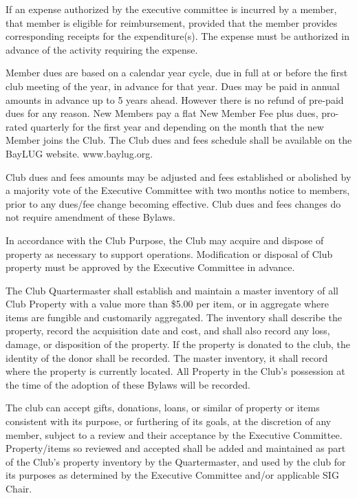 \documentclass{bylaws}
\begin{document}
If an expense authorized by the executive committee is incurred by a member, that member is eligible for reimbursement, provided that the member provides corresponding receipts for the expenditure(s). The expense must be authorized in advance of the activity requiring the expense. 

Member dues are based on a calendar year cycle, due in full at or before the first club meeting of the year, in advance for that year. Dues may be paid in annual amounts in advance up to 5 years ahead. However there is no refund of pre-paid dues for any reason. New Members pay a flat New Member Fee plus dues, pro-rated quarterly for the first year and depending on the month that the new Member joins the Club. The Club dues and fees schedule shall be available on the BayLUG website. www.baylug.org. 

Club dues and fees amounts may be adjusted and fees established or abolished by a majority vote of the Executive Committee with two months notice to members, prior to any dues/fee change becoming effective. Club dues and fees changes do not require amendment of these Bylaws.

In accordance with the Club Purpose, the Club may acquire and dispose of property as necessary to support operations. Modification or disposal of Club property must be approved by the Executive Committee in advance. 

The Club Quartermaster shall establish and maintain a master inventory of all Club Property with a value more than \$5.00 per item, or in aggregate where items are fungible and customarily aggregated. The inventory shall describe the property, record the acquisition date and cost, and shall also record any loss, damage, or disposition of the property. If the property is donated to the club, the identity of the donor shall be recorded. The master inventory, it shall record where the property is currently located. 
All Property in the Club's possession at the time of the adoption of these Bylaws will be recorded.

The club can accept gifts, donations, loans, or similar of property or items consistent with its purpose, or furthering of its goals, at the discretion of any member, subject to a review and their acceptance by the Executive Committee. Property/items so reviewed and accepted shall be added and maintained as part of the Club's property inventory by the Quartermaster, and used by the club for its purposes as determined by the Executive Committee and/or applicable SIG Chair.
\end{document}
